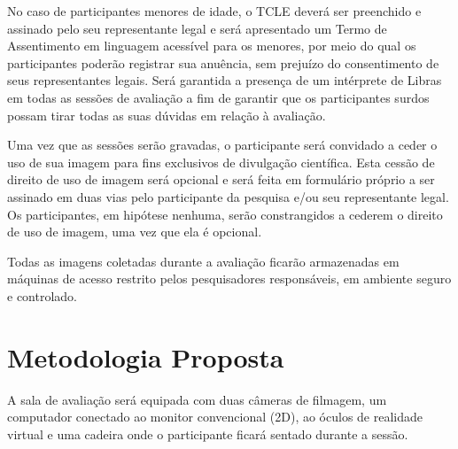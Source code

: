 \documentclass[a4paper,11pt,titlepage,singlespacing]{article}
\begin{document}
No caso de participantes menores de idade, o TCLE deverá ser preenchido e assinado pelo seu representante legal e será apresentado um Termo de Assentimento em linguagem acessível para os menores, por meio do qual os participantes poderão registrar sua anuência, sem prejuízo do consentimento de seus representantes legais.
Será garantida a presença de um intérprete de Libras em todas as sessões de avaliação a fim de garantir que os participantes surdos possam tirar todas as suas dúvidas em relação à avaliação.

Uma vez que as sessões serão gravadas, o participante será convidado a ceder o uso de sua imagem para fins exclusivos de divulgação científica. Esta cessão de direito de uso de imagem será opcional e será feita em formulário próprio a ser assinado em duas vias pelo participante da pesquisa e/ou seu representante legal. Os participantes, em hipótese nenhuma, serão constrangidos a cederem o direito de uso de imagem, uma vez que ela é opcional.

Todas as imagens coletadas durante a avaliação ficarão armazenadas em máquinas de acesso restrito pelos pesquisadores responsáveis, em ambiente seguro e controlado.




\section{Metodologia Proposta}


A sala de avaliação será equipada com duas câmeras de filmagem, um computador conectado ao monitor convencional (2D), ao óculos de realidade virtual e uma cadeira onde o participante ficará sentado durante a sessão.
\end{document}
